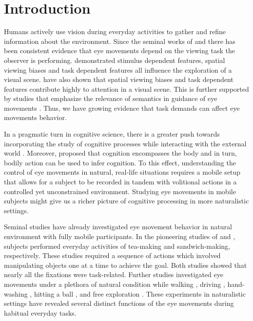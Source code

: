 \section{Introduction}

Humans actively use vision during everyday activities to gather and refine information about the environment. Since the seminal works of \citet{Yarbus2013-eu} and \citet{Buswell1935-di} there has been consistent evidence that eye movements depend on the viewing task the observer is performing.  \citet{Kollmorgen2010-wg} demonstrated stimulus dependent features, spatial viewing biases and task dependent features all influence the exploration of a visual scene. have also shown that spatial viewing biases and task dependent features contribute highly to attention in a visual scene. This is further supported by studies that emphasize the relevance of semantics in guidance of eye movements \citep{Henderson2017-it, Einhauser2008-yi}. Thus, we have growing evidence that task demands can affect eye movements behavior.

In a pragmatic turn in cognitive science, there is a greater push towards incorporating the study of cognitive processes while interacting with the external world \citep{Parada2020-qq}. Moreover, \citet{Engel2013-bx} proposed that cognition encompasses the body and in turn, bodily action can be used to infer cognition. To this effect, understanding the control of eye movements in natural, real-life situations requires a mobile setup that allows for a subject to be recorded in tandem with volitional actions in a controlled yet unconstrained environment. Studying eye movements in mobile subjects might give us a richer picture of cognitive processing in more naturalistic settings.

Seminal studies have already investigated eye movement behavior in natural environment with fully mobile participants. In the pioneering studies of \citet{Land1999-ol} and \citet{Hayhoe2003-lw}, subjects performed everyday activities of tea-making and sandwich-making, respectively. These studies required a sequence of actions which involved manipulating objects one at a time to achieve the goal. Both studies showed that nearly all the fixations were task-related. Further studies investigated eye movements under a plethora of natural condition while walking \citep{Matthis2018-ho}, driving \citep{Mars2012-bn, Sullivan2012-gg, Navarro2020-wv}, hand-washing \citep{Pelz2001-cn}, hitting a ball \citep{Land2000-pw}, and free exploration \citep{Schumann2008-un}. These experiments in naturalistic settings have revealed several distinct functions of the eye movements during habitual everyday tasks.

